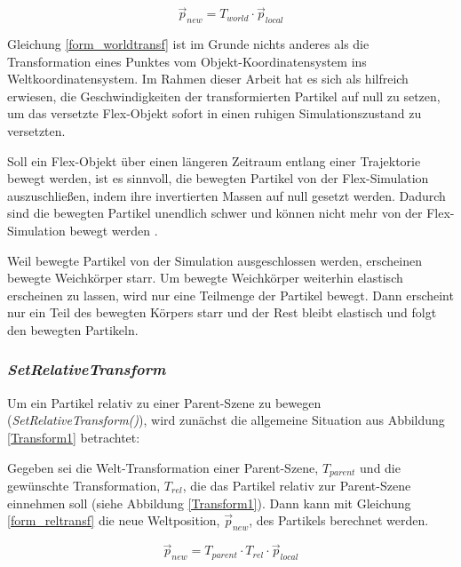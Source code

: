 \begin{equation}
\vec{p}_{new} = T_{world} \cdot \vec{p}_{local}
\label{form_worldtransf}
\end{equation}

Gleichung \ref{form_worldtransf} ist im Grunde nichts anderes als die Transformation eines Punktes vom Objekt-Koordinatensystem ins Weltkoordinatensystem. Im Rahmen dieser Arbeit hat es sich als hilfreich erwiesen, die Geschwindigkeiten der transformierten Partikel auf null zu setzen, um das versetzte Flex-Objekt sofort in einen ruhigen Simulationszustand zu versetzten. 

Soll ein Flex-Objekt  über einen längeren Zeitraum entlang einer Trajektorie bewegt werden, ist es sinnvoll, die bewegten Partikel von der Flex-Simulation auszuschließen, indem ihre invertierten Massen auf null gesetzt werden. Dadurch sind die bewegten Partikel unendlich schwer und können nicht mehr von der Flex-Simulation bewegt werden \cite{PBD} \cite{UPP}. 

Weil bewegte Partikel von der Simulation ausgeschlossen werden, erscheinen bewegte Weichkörper starr. Um bewegte Weichkörper weiterhin elastisch erscheinen zu lassen, wird nur eine Teilmenge der Partikel bewegt. Dann erscheint nur ein Teil des bewegten Körpers starr und der Rest bleibt elastisch und folgt den bewegten Partikeln.

\subsubsection{\textit{SetRelativeTransform}}
\label{subsubsec_reltrans}
Um ein Partikel relativ zu einer Parent-Szene zu bewegen (\textit{SetRelativeTransform()}), wird zunächst die allgemeine Situation aus Abbildung \ref{Transform1} betrachtet:


Gegeben sei die Welt-Transformation einer Parent-Szene, $T_{parent}$ und die gewünschte Transformation, $T_{rel}$, die das Partikel relativ zur Parent-Szene einnehmen soll (siehe Abbildung \ref{Transform1}). Dann kann mit Gleichung \ref{form_reltransf} die neue Weltposition, $\vec{p}_{new}$, des Partikels berechnet werden.

\begin{equation}
\vec{p}_{new} = T_{parent} \cdot T_{rel} \cdot \vec{p}_{local}
\label{form_reltransf}
\end{equation}

